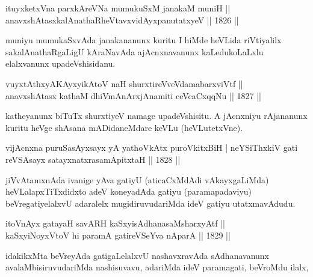 
\begin{shl}
ituyxketxVna parxkAreVNa mumukuSxM janakaM muniH || \\
anavxshAtasxkalAnathaRheVtavxvidAyxpanutatxyeV \hfill || 1826 ||  
\end{shl}

\begin{artha}
muniyu mumukaSxvAda janakananunx kuritu I hiMde heVLida riVtiyalilx
sakalAnathaRgaLigU kAraNavAda ajAcnxnavanunx kaLedukoLaLxlu
elalxvanunx upadeVshisidanu.
\end{artha}

\begin{shl}
vuyxtAthxyA\s \s KAyxyikAtoV naH shurxtireVveVdamabarxviVtf || \\
anavxshAtasx kathaM dhiVmAnArxjAnamiti ceVcaCxqqNu \hfill || 1827 || 
\end{shl}

\begin{artha}
katheyanunx biTuTx shurxtiyeV namage upadeVshisitu. A
jAcnxniyu rAjananunx kuritu heVge shAsana mADidaneMdare keVLu
(heVLutetxVne).
\end{artha}


\begin{shl}
vijAcnxna puruSasAyxsayx yA yathoVkAtx puroVkitxBiH |
neYSiThxkiV gati reVSA\s sayx satayxnatxrasamApitxtaH || 1828 ||
\end{shl}

\begin{artha}
jiVvAtamxnAda ivanige yAva gatiyU (aticaCxMdAdi vAkayxgaLiMda)
heVLalapxTiTxdidxto adeV koneyadAda gatiyu (paramapadaviyu)
beVregatiyelalxvU adaralelx mugidiruvudariMda ideV gatiyu utatxmavAdudu.
\end{artha}


\begin{shl}
itoV\s nAyx gatayaH savARH kaSxyisAdhanasaMsharxyAtf ||  \\
kaSxyiNoyxV\s toV hi paramA gatireVSeYva nAparA \hfill || 1829 ||  
\end{shl}

\begin{artha}
idakikxMta beVreyAda gatigaLelalxvU nashavxravAda sAdhanavanunx
avalaMbisiruvudariMda nashisuvavu, adariMda ideV paramagati, beVroMdu
ilalx,
\end{artha}

